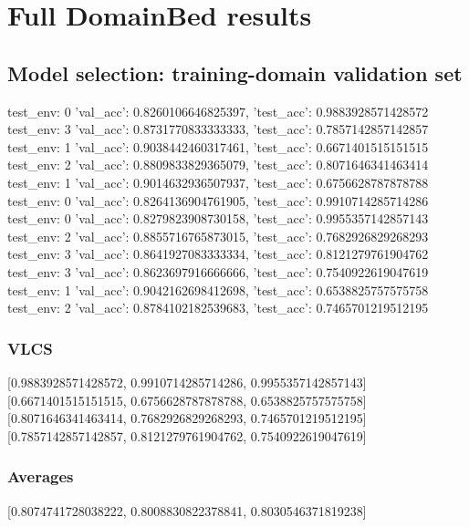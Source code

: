 \documentclass{article}
\begin{document}
\section{Full DomainBed results}

\subsection{Model selection: training-domain validation set}
test_env: 0
{'val_acc': 0.8260106646825397, 'test_acc': 0.9883928571428572}
test_env: 3
{'val_acc': 0.8731770833333333, 'test_acc': 0.7857142857142857}
test_env: 1
{'val_acc': 0.9038442460317461, 'test_acc': 0.6671401515151515}
test_env: 2
{'val_acc': 0.8809833829365079, 'test_acc': 0.8071646341463414}
test_env: 1
{'val_acc': 0.9014632936507937, 'test_acc': 0.6756628787878788}
test_env: 0
{'val_acc': 0.8264136904761905, 'test_acc': 0.9910714285714286}
test_env: 0
{'val_acc': 0.8279823908730158, 'test_acc': 0.9955357142857143}
test_env: 2
{'val_acc': 0.8855716765873015, 'test_acc': 0.7682926829268293}
test_env: 3
{'val_acc': 0.8641927083333334, 'test_acc': 0.8121279761904762}
test_env: 3
{'val_acc': 0.8623697916666666, 'test_acc': 0.7540922619047619}
test_env: 1
{'val_acc': 0.9042162698412698, 'test_acc': 0.6538825757575758}
test_env: 2
{'val_acc': 0.8784102182539683, 'test_acc': 0.7465701219512195}

\subsubsection{VLCS}
[0.9883928571428572, 0.9910714285714286, 0.9955357142857143]
[0.6671401515151515, 0.6756628787878788, 0.6538825757575758]
[0.8071646341463414, 0.7682926829268293, 0.7465701219512195]
[0.7857142857142857, 0.8121279761904762, 0.7540922619047619]

\begin{center}
\end{center}

\subsubsection{Averages}
[0.8074741728038222, 0.8008830822378841, 0.8030546371819238]

\begin{center}
\end{center}
\end{document}
